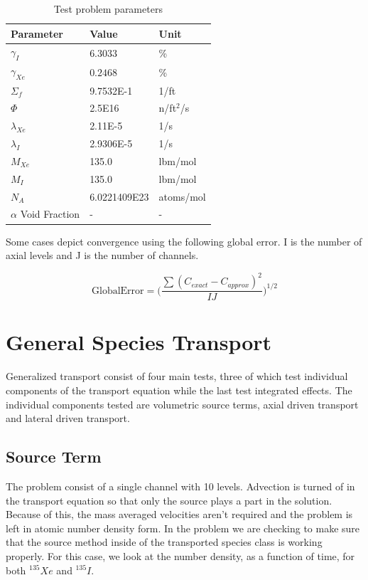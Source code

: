 \begin{table}[htbp!]
   \caption{\label{tab:Test_parameters} Test problem parameters}
   \centering
   \begin{tabular}{lll}
   \hline
   \textbf{Parameter} & \textbf{Value} & \textbf{Unit} \\
   \hline 
   $\gamma_{I}$ & $6.3033$ \cite{cole2019} & \% \\ [1ex]
   $\gamma_{Xe}$ & $0.2468$ \cite{cole2019} & \% \\ [1ex]
   $\Sigma_{f}$ & 9.7532E-1 \cite{cole2019} & 1/ft \\ [1ex]
   $\Phi$ & 2.5E16 \cite{nestor1960} &  n/ft${}^{2}$/s \\ [1ex]
   $\lambda_{Xe}$ & 2.11E-5 \cite{cole2019} & 1/s\\ [1ex]
   $\lambda_{I}$ & 2.9306E-5 \cite{cole2019} & 1/s  \\ [1ex]
   $M_{Xe}$ & 135.0 & lbm/mol\\ [1ex]
   $M_{I}$ & 135.0 & lbm/mol \\ [1ex]
   $N_{A}$ & 6.0221409E23 & atoms/mol \\ [1ex] 
   $\alpha$ Void Fraction & - & - \\ [1ex]
   \hline
   \end{tabular}
\end{table}

Some cases depict convergence using the following global error. I is the number of axial levels and J is the number of channels.

\begin{equation}
    \text{GlobalError} = \bigg(\frac{\sum (C_{exact}-C_{approx})^{2}}{IJ}\bigg)^{1/2}
\end{equation}


\section{General Species Transport}\label{sec:gen_transport}
Generalized transport consist of four main tests, three of which test individual components of the transport equation while the last test integrated effects. The individual components tested are volumetric source terms, axial driven transport and lateral driven transport. 

\subsection{Source Term}
The problem consist of a single channel with 10 levels. Advection is turned of in the transport equation so that only the source plays a part in the solution. Because of this, the mass averaged velocities aren't required and the problem is left in atomic number density form. In the problem we are checking to make sure that the source method inside of the transported species class is working properly. For this case, we look at the number density, as a function of time, for both ${}^{135}Xe$ and ${}^{135}I$. 

